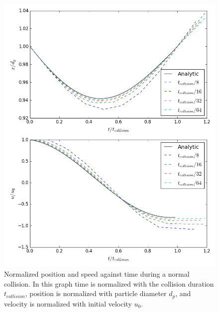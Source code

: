 \documentclass[a4paper,11pt,titlepage]{report}
\begin{document}
\begin{figure}[!htb]
\centering
\includegraphics[scale=0.7]{figures/opencl_verification/normal_force_verification.png}
\caption{Normalized position and speed against time during a normal collision. In this graph time is normalized with the collision duration $t_{collision}$, position is normalized with particle diameter $d_p$, and velocity is normalized with initial velocity $u_0$.}
\label{fig:opencl_normal_force_verification}
\end{figure}
\end{document}
